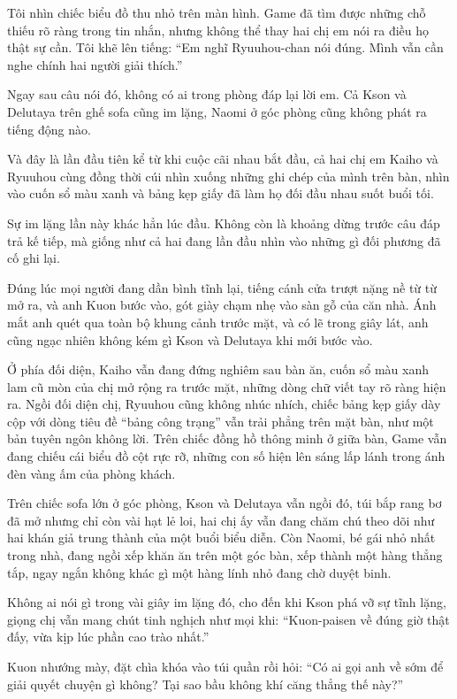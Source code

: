 \documentclass[../main.tex]{subfiles}
\begin{document}
Tôi nhìn chiếc biểu đồ thu nhỏ trên màn hình. Game đã tìm được những chỗ thiếu rõ ràng trong tin nhắn, nhưng không thể thay hai chị em nói ra điều họ thật sự cần. Tôi khẽ lên tiếng: ``Em nghĩ Ryuuhou-chan nói đúng. Mình vẫn cần nghe chính hai người giải thích.''

Ngay sau câu nói đó, không có ai trong phòng đáp lại lời em. Cả Kson và Delutaya trên ghế sofa cũng im lặng, Naomi ở góc phòng cũng không phát ra tiếng động nào.

Và đây là lần đầu tiên kể từ khi cuộc cãi nhau bắt đầu, cả hai chị em Kaiho và Ryuuhou cùng đồng thời cúi nhìn xuống những ghi chép của mình trên bàn, nhìn vào cuốn sổ màu xanh và bảng kẹp giấy đã làm họ đối đầu nhau suốt buổi tối.

Sự im lặng lần này khác hẳn lúc đầu. Không còn là khoảng dừng trước câu đáp trả kế tiếp, mà giống như cả hai đang lần đầu nhìn vào những gì đối phương đã cố ghi lại.

\ct

Đúng lúc mọi người đang dần bình tĩnh lại, tiếng cánh cửa trượt nặng nề từ từ mở ra, và anh Kuon bước vào, gót giày chạm nhẹ vào sàn gỗ của căn nhà. Ánh mắt anh quét qua toàn bộ khung cảnh trước mặt, và có lẽ trong giây lát, anh cũng ngạc nhiên không kém gì Kson và Delutaya khi mới bước vào.

Ở phía đối diện, Kaiho vẫn đang đứng nghiêm sau bàn ăn, cuốn sổ màu xanh lam cũ mòn của chị mở rộng ra trước mặt, những dòng chữ viết tay rõ ràng hiện ra. Ngồi đối diện chị, Ryuuhou cũng không nhúc nhích, chiếc bảng kẹp giấy dày cộp với dòng tiêu đề ``bảng công trạng'' vẫn trải phẳng trên mặt bàn, như một bản tuyên ngôn không lời. Trên chiếc đồng hồ thông minh ở giữa bàn, Game vẫn đang chiếu cái biểu đồ cột rực rỡ, những con số hiện lên sáng lấp lánh trong ánh đèn vàng ấm của phòng khách.

Trên chiếc sofa lớn ở góc phòng, Kson và Delutaya vẫn ngồi đó, túi bắp rang bơ đã mở nhưng chỉ còn vài hạt lẻ loi, hai chị ấy vẫn đang chăm chú theo dõi như hai khán giả trung thành của một buổi biểu diễn. Còn Naomi, bé gái nhỏ nhất trong nhà, đang ngồi xếp khăn ăn trên một góc bàn, xếp thành một hàng thẳng tắp, ngay ngắn không khác gì một hàng lính nhỏ đang chờ duyệt binh.

Không ai nói gì trong vài giây im lặng đó, cho đến khi Kson phá vỡ sự tĩnh lặng, giọng chị vẫn mang chút tinh nghịch như mọi khi: ``Kuon-paisen về đúng giờ thật đấy, vừa kịp lúc phần cao trào nhất.''

Kuon nhướng mày, đặt chìa khóa vào túi quần rồi hỏi: ``Có ai gọi anh về sớm để giải quyết chuyện gì không? Tại sao bầu không khí căng thẳng thế này?''
\end{document}
